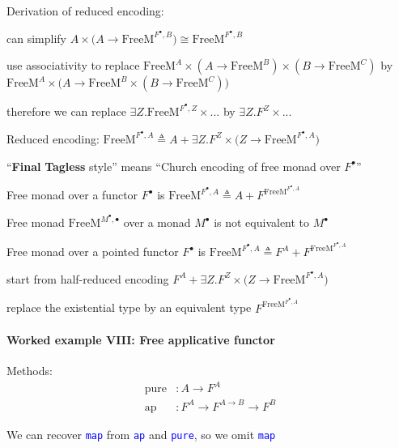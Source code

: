 Derivation of reduced encoding: 

can simplify $A\times\big(A\rightarrow\text{FreeM}^{F^{\bullet},B}\big)\cong\text{FreeM}^{F^{\bullet},B}$

use associativity to replace $\text{FreeM}^{A}\times(A\rightarrow\text{FreeM}^{B})\times(B\rightarrow\text{FreeM}^{C})$
by $\text{FreeM}^{A}\times\big(A\rightarrow\text{FreeM}^{B}\times(B\rightarrow\text{FreeM}^{C})\big)$

therefore we can replace $\exists Z.\text{FreeM}^{F^{\bullet},Z}\times...$
by $\exists Z.F^{Z}\times...$

Reduced encoding: $\text{FreeM}^{F^{\bullet},A}\triangleq A+\exists Z.F^{Z}\times\big(Z\rightarrow\text{FreeM}^{F^{\bullet},A}\big)$

\textsf{``}\textbf{Final} \textbf{Tagless} style\textsf{''} means \textsf{``}Church encoding
of free monad over $F^{\bullet}$\textsf{''}

Free monad over a functor $F^{\bullet}$ is $\text{FreeM}^{F^{\bullet},A}\triangleq A+F^{\text{FreeM}^{F^{\bullet},A}}$

Free monad $\text{FreeM}^{M^{\bullet},\bullet}$ over a monad $M^{\bullet}$
is not equivalent to $M^{\bullet}$

Free monad over a pointed functor $F^{\bullet}$ is {\footnotesize{}$\text{FreeM}^{F^{\bullet},A}\triangleq F^{A}+F^{\text{FreeM}^{F^{\bullet},A}}$}{\footnotesize\par}

start from half-reduced encoding $F^{A}+\exists Z.F^{Z}\times\big(Z\rightarrow\text{FreeM}^{F^{\bullet},A}\big)$ 

replace the existential type by an equivalent type $F^{\text{FreeM}^{F^{\bullet},A}}$


\paragraph{Worked example VIII: Free applicative functor}

Methods:
\begin{align*}
\text{pure} & :A\rightarrow F^{A}\\
\text{ap} & :F^{A}\rightarrow F^{A\rightarrow B}\rightarrow F^{B}
\end{align*}

We can recover \texttt{\textcolor{blue}{\footnotesize{}map}} from
\texttt{\textcolor{blue}{\footnotesize{}ap}} and \texttt{\textcolor{blue}{\footnotesize{}pure}},
so we omit \texttt{\textcolor{blue}{\footnotesize{}map}} 

